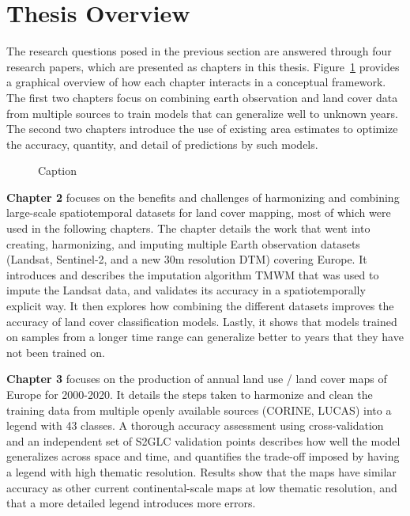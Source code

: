 \section{Thesis Overview}

The research questions posed in the previous section are answered through four research papers, which are presented as chapters in this thesis. Figure~\ref{fig:01_conceptual_framework} provides a graphical overview of how each chapter interacts in a conceptual framework. The first two chapters focus on combining earth observation and land cover data from multiple sources to train models that can generalize well to unknown years. The second two chapters introduce the use of existing area estimates to optimize the accuracy, quantity, and detail of predictions by such models.

\begin{figure}
    \centering
    \caption{Caption}
    \label{fig:01_conceptual_framework}
\end{figure}




\textbf{Chapter 2} focuses on the benefits and challenges of harmonizing and combining large-scale spatiotemporal datasets for land cover mapping, most of which were used in the following chapters. The chapter details the work that went into creating, harmonizing, and imputing multiple Earth observation datasets (Landsat, Sentinel-2, and a new 30m resolution DTM) covering Europe. It introduces and describes the imputation algorithm TMWM that was used to impute the Landsat data, and validates its accuracy in a spatiotemporally explicit way. It then explores how combining the different datasets improves the accuracy of land cover classification models. Lastly, it shows that models trained on samples from a longer time range can generalize better to years that they have not been trained on.


\textbf{Chapter 3} focuses on the production of annual land use / land cover maps of Europe for 2000-2020. It details the steps taken to harmonize and clean the training data from multiple openly available sources (CORINE, LUCAS) into a legend with 43 classes. A thorough accuracy assessment using cross-validation and an independent set of S2GLC validation points describes how well the model generalizes across space and time, and quantifies the trade-off imposed by having a legend with high thematic resolution. Results show that the maps have similar accuracy as other current continental-scale maps at low thematic resolution, and that a more detailed legend introduces more errors.

